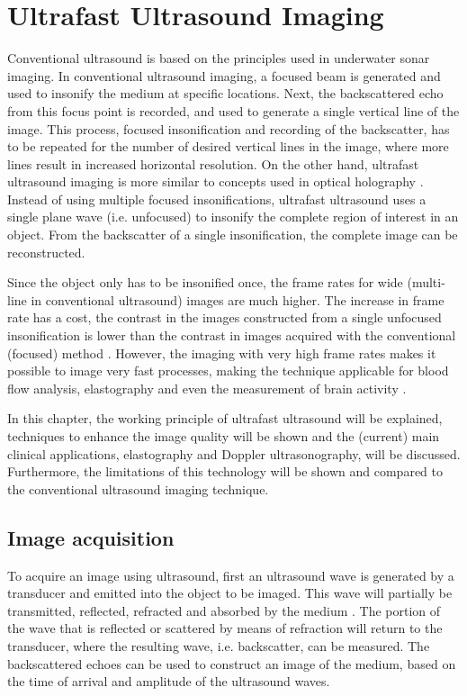 \chapter{Ultrafast Ultrasound Imaging}
\label{chap:ultrafast_ultrasound}
Conventional ultrasound is based on the principles used in underwater sonar imaging. In conventional ultrasound imaging, a focused beam is generated and used to insonify the medium at specific locations. Next, the backscattered echo from this focus point is recorded, and used to generate a single vertical line of the image. This process, focused insonification and recording of the backscatter, has to be repeated for the number of desired vertical lines in the image, where more lines result in increased horizontal resolution. On the other hand, ultrafast ultrasound imaging is more similar to concepts used in optical holography \cite{tanter_ultrafast_2014}. Instead of using multiple focused insonifications, ultrafast ultrasound uses a single plane wave (i.e. unfocused) to insonify the complete region of interest in an object. From the backscatter of a single insonification, the complete image can be reconstructed.

Since the object only has to be insonified once, the frame rates for wide (multi-line in conventional ultrasound) images are much higher. The increase in frame rate has a cost, the contrast in the images constructed from a single unfocused insonification is lower than the contrast in images acquired with the conventional (focused) method \cite{sandrin_time-resolved_1999}. However, the imaging with very high frame rates makes it possible to image very fast processes, making the technique applicable for blood flow analysis, elastography and even the measurement of brain activity \cite{tanter_ultrafast_2014}. 

In this chapter, the working principle of ultrafast ultrasound will be explained, techniques to enhance the image quality will be shown and the (current) main clinical applications, elastography and Doppler ultrasonography, will be discussed. Furthermore, the limitations of this technology will be shown and compared to the conventional ultrasound imaging technique.




\section{Image acquisition}
To acquire an image using ultrasound, first an ultrasound wave is generated by a transducer and emitted into the object to be imaged. This wave will partially be transmitted, reflected, refracted and absorbed by the medium \cite{pillen_ultrasonography_2013}. The portion of the wave that is reflected or scattered by means of refraction will return to the transducer, where the resulting wave, i.e. backscatter, can be measured. The backscattered echoes can be used to construct an image of the medium, based on the time of arrival and amplitude of the ultrasound waves. 

